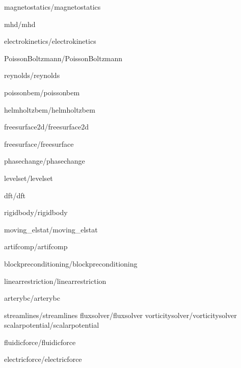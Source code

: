 \documentclass[a4paper,english,10pt]{report}    %
\newcommand{\Include}{}
\begin{document}
\graphicspath{{./}{magnetostatics/}}
\Include{magnetostatics/magnetostatics}

\graphicspath{{./}{mhd/}}
\Include{mhd/mhd}

\graphicspath{{./}{electrokinetics/}}
\Include{electrokinetics/electrokinetics}

\graphicspath{{./}{PoissonBoltzmann/}}
\Include{PoissonBoltzmann/PoissonBoltzmann}

\graphicspath{{./}{reynolds/}}
\Include{reynolds/reynolds}

\graphicspath{{./}{poissonbem/}}
\Include{poissonbem/poissonbem}

\graphicspath{{./}{helmholtzbem/}}
\Include{helmholtzbem/helmholtzbem}

\graphicspath{{./}{freesurface2d/}}
\Include{freesurface2d/freesurface2d}

\graphicspath{{./}{freesurface/}}
\Include{freesurface/freesurface}

\graphicspath{{./}{phasechange/}}
\Include{phasechange/phasechange}


\graphicspath{{./}{levelset/}}
\Include{levelset/levelset}

\graphicspath{{./}{dft/}}
\Include{dft/dft}

\graphicspath{{./}{rigidbody/}}
\Include{rigidbody/rigidbody}

\graphicspath{{./}{moving_elstat/}}
\Include{moving_elstat/moving_elstat}

\graphicspath{{./}{artifcomp/}}
\Include{artifcomp/artifcomp}

\graphicspath{{./}{blockpreconditioning/}}
\Include{blockpreconditioning/blockpreconditioning}


\graphicspath{{./}{linearrestriction/}}
\Include{linearrestriction/linearrestriction}

\graphicspath{{./}{arterybc/}}
\Include{arterybc/arterybc}

\graphicspath{{./}{streamlines/}}
\Include{streamlines/streamlines}
\Include{fluxsolver/fluxsolver}
\Include{vorticitysolver/vorticitysolver}
\Include{scalarpotential/scalarpotential}

\Include{fluidicforce/fluidicforce}
\graphicspath{{./}{electricforce/}}
\Include{electricforce/electricforce}
\end{document}
